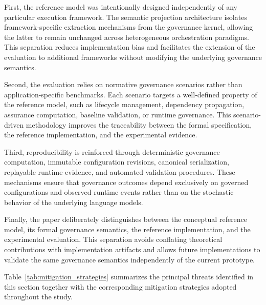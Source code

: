 \documentclass[10pt]{article}
\begin{document}
First, the reference model was intentionally designed independently of any particular execution framework. The semantic projection architecture isolates framework-specific extraction mechanisms from the governance kernel, allowing the latter to remain unchanged across heterogeneous orchestration paradigms. This separation reduces implementation bias and facilitates the extension of the evaluation to additional frameworks without modifying the underlying governance semantics.

Second, the evaluation relies on normative governance scenarios rather than application-specific benchmarks. Each scenario targets a well-defined property of the reference model, such as lifecycle management, dependency propagation, assurance computation, baseline validation, or runtime governance. This scenario-driven methodology improves the traceability between the formal specification, the reference implementation, and the experimental evidence.

Third, reproducibility is reinforced through deterministic governance computation, immutable configuration revisions, canonical serialization, replayable runtime evidence, and automated validation procedures. These mechanisms ensure that governance outcomes depend exclusively on governed configurations and observed runtime events rather than on the stochastic behavior of the underlying language models.

Finally, the paper deliberately distinguishes between the conceptual reference model, its formal governance semantics, the reference implementation, and the experimental evaluation. This separation avoids conflating theoretical contributions with implementation artifacts and allows future implementations to validate the same governance semantics independently of the current prototype.

Table~\ref{tab:mitigation_strategies} summarizes the principal threats identified in this section together with the corresponding mitigation strategies adopted throughout the study.
\end{document}
